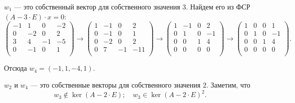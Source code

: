 \documentclass[a4paper]{article}
\begin{document}
\begin{solution}
        \begin{options}
        \item 
            $w_1$ --- это собственный вектор для собственного значения $3$. Найдем его из ФСР $(A - 3 \cdot E) \cdot x = 0$:
            \begin{equation*}
                \begin{pmatrix}
                    -1 & 1 & 0 & -2 \\
                    0 & -2 & 0 & 2 \\
                    3 & 4 & -1 & -5 \\
                    0 & -1 & 0 & 1 \\
                \end{pmatrix}
                \to
                \begin{pmatrix}
                    1 & -1 & 0 & 2 \\
                    0 & -1 & 0 & 1 \\
                    0 & -2 & 0 & 2 \\
                    0 & 7 & -1 & -11 \\
                \end{pmatrix}
                \to
                \begin{pmatrix}
                    1 & -1 & 0 & 2 \\
                    0 & 1 & 0 & -1 \\
                    0 & 0 & 1 & 4 \\
                    0 & 0 & 0 & 0 \\
                \end{pmatrix}
                \to
                \begin{pmatrix}
                    1 & 0 & 0 & 1 \\
                    0 & 1 & 0 & -1 \\
                    0 & 0 & 1 & 4 \\
                    0 & 0 & 0 & 0 \\
                \end{pmatrix}.
            \end{equation*}

            Отсюда \colorbox{blue!30}{$w_4 = (-1, 1, -4, 1)$}.

        \item 
            $w_2$ и $w_4$ --- это собственные векторы для собственного значения $2$. Заметим, что
            \begin{equation*}
                w_3 \notin \ker (A - 2 \cdot E); \quad
                w_3 \in \ker (A - 2 \cdot E)^2.
            \end{equation*}


\end{options}
\end{solution}
\end{document}
